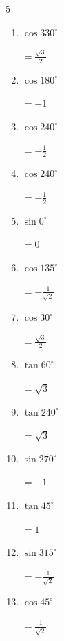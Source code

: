 \begin{multicols}{5}
\begin{enumerate}
  \item $\displaystyle \cos{330^\circ}$

        $\displaystyle =\frac{\sqrt{3}}{2}$

\columnbreak %

  \item $\displaystyle \cos{180^\circ}$

        $\displaystyle =-1$

  \item $\displaystyle \cos{240^\circ}$

        $\displaystyle =-\frac{1}{2}$

  \item $\displaystyle \cos{240^\circ}$

        $\displaystyle =-\frac{1}{2}$

  \item $\displaystyle \sin{0^\circ}$

        $\displaystyle =0$

  \item $\displaystyle \cos{135^\circ}$

        $\displaystyle =-\frac{1}{\sqrt{2}}$

  \item $\displaystyle \cos{30^\circ}$

        $\displaystyle =\frac{\sqrt{3}}{2}$

  \item $\displaystyle \tan{60^\circ}$

        $\displaystyle =\sqrt{3}$

  \item $\displaystyle \tan{240^\circ}$

        $\displaystyle =\sqrt{3}$

  \item $\displaystyle \sin{270^\circ}$

        $\displaystyle =-1$

  \item $\displaystyle \tan{45^\circ}$

        $\displaystyle =1$

  \item $\displaystyle \sin{315^\circ}$

        $\displaystyle =-\frac{1}{\sqrt{2}}$

  \item $\displaystyle \cos{45^\circ}$

        $\displaystyle =\frac{1}{\sqrt{2}}$


\end{enumerate}
\end{multicols}
